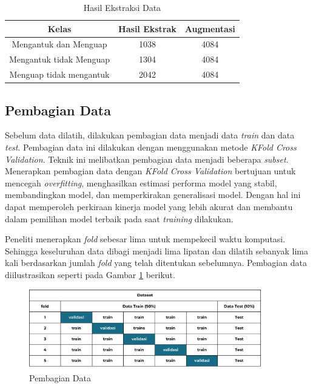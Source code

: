             \begin{table}[h]
            \centering
            \caption{Hasil Ekstraksi Data}
            \begin{tabular}{ccc}
                \toprule
                \textbf{Kelas} & \textbf{Hasil Ekstrak} & \textbf{Augmentasi }\\
                \midrule
                      
                           Mengantuk dan Menguap & 1038 & 4084 \\
                          Mengantuk tidak Menguap & 1304 & 4084 \\
                           Menguap tidak mengantuk& 2042 & 4084 \\
                
                    \bottomrule
                \end{tabular}
                \label{Hasil Augmentasi Data}
            \end{table}



        
\newpage
    
    \subsection{Pembagian Data}
    
    Sebelum data dilatih, dilakukan pembagian data menjadi data 
    \textit{train} dan data \textit{test}. Pembagian data ini 
    dilakukan dengan menggunakan metode \textit{KFold Cross Validation}. 
    Teknik ini melibatkan pembagian data menjadi beberapa \textit{subset}. 
    Menerapkan pembagian data dengan \textit{KFold Cross Validation} 
    bertujuan untuk mencegah \textit{overfitting}, 
    menghasilkan estimasi performa model yang stabil, 
    membandingkan model, dan memperkirakan generalisasi model. 
    Dengan hal ini dapat memperoleh perkiraan kinerja model yang 
    lebih akurat dan membantu dalam pemilihan model terbaik pada 
    saat \textit{training} dilakukan. 
    
    Peneliti menerapkan \textit{fold} sebesar lima untuk mempekecil waktu komputasi. Sehingga keseluruhan data dibagi menjadi lima lipatan dan dilatih sebanyak lima kali berdasarkan jumlah \textit{fold }yang telah ditentukan sebelumnya. Pembagian data diilustrasikan seperti pada Gambar \ref{Pembagian Data} berikut.

         \begin{figure}[H]
               \centering
               \includegraphics[width=0.90\textwidth]{figures/bab4/kfold.png}
               \caption{Pembagian Data}
               \label{Pembagian Data}

         \end{figure}



